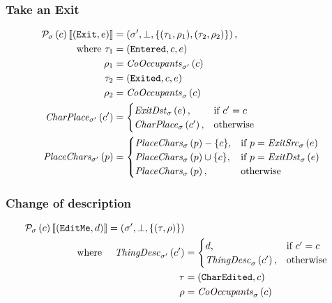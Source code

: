 \subsubsection{Take an Exit}
\begin{align*}
  \mathit{\mathcal{P}}_{\sigma}\left(c\right)\llbracket (\texttt{Exit}, e) \rrbracket &=
  \left(\sigma', \bot, \{(\tau_1, \rho_1), (\tau_2,
    \rho_2)\}\right),\\
  ~~~~~\text{where}~\tau_1 & = (\texttt{Entered}, c, e) \\
  \rho_1 & = \mathit{CoOccupants}_{\sigma'}\left(c\right) \\
  \tau_2 & = (\texttt{Exited}, c, e) \\
  \rho_2 & = \mathit{CoOccupants}_{\sigma}\left(c\right) \\
  \mathit{CharPlace}_{\sigma'}\left(c'\right) &=
  \begin{cases}
    \mathit{ExitDst}_{\sigma}\left(e\right) , & \text{if}~ c' = c \\
    \mathit{CharPlace}_{\sigma}\left(c'\right), & \text{otherwise}
  \end{cases} \\
  \mathit{PlaceChars}_{\sigma'}\left(p\right) &=
  \begin{cases}
    \mathit{PlaceChars}_{\sigma}\left(p\right) - \{ c \}, & \text{if}~ p =
    \mathit{ExitSrc}_{\sigma}\left(e\right) \\
    \mathit{PlaceChars}_{\sigma}\left(p\right) \cup \{ c \}, & \text{if}~ p =
    \mathit{ExitDst}_{\sigma}\left(e\right) \\
    \mathit{PlaceChars}_{\sigma}\left(p\right), & \text{otherwise}
  \end{cases}
\end{align*}

\subsubsection{Change of description}
\begin{align*}
  \mathit{\mathcal{P}}_{\sigma}\left(c\right)\llbracket (\texttt{EditMe}, d) \rrbracket =
  \left(\sigma', \bot, \{ (\tau, \rho) \}\right)\\
  ~~~~\text{where}~~~~
  \mathit{ThingDesc}_{\sigma'}\left(c'\right) &=
  \begin{cases}
    d, & \text{if}~c' = c \\
    \mathit{ThingDesc}_{\sigma}\left(c'\right), & \text{otherwise}
  \end{cases} \\
  \tau & = (\texttt{CharEdited}, c) \\
  \rho & = \mathit{CoOccupants}_{\sigma}\left(c\right)
\end{align*}



